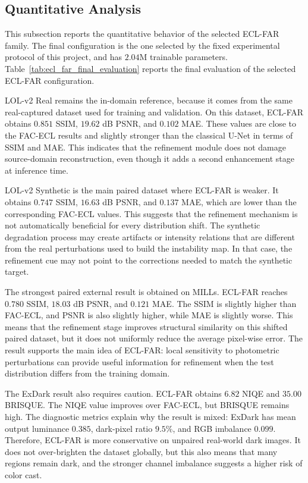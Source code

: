 \subsection{Quantitative Analysis}

This subsection reports the quantitative behavior of the selected ECL-FAR family. The final configuration is the one selected by the fixed experimental protocol of this project, and has $2.04$M trainable parameters. Table~\ref{tab:ecl_far_final_evaluation} reports the final evaluation of the selected ECL-FAR configuration.



LOL-v2 Real remains the in-domain reference, because it comes from the same real-captured dataset used for training and validation. On this dataset, ECL-FAR obtains $0.851$ SSIM, $19.62$ dB PSNR, and $0.102$ MAE. These values are close to the FAC-ECL results and slightly stronger than the classical U-Net in terms of SSIM and MAE. This indicates that the refinement module does not damage source-domain reconstruction, even though it adds a second enhancement stage at inference time.

LOL-v2 Synthetic is the main paired dataset where ECL-FAR is weaker. It obtains $0.747$ SSIM, $16.63$ dB PSNR, and $0.137$ MAE, which are lower than the corresponding FAC-ECL values. This suggests that the refinement mechanism is not automatically beneficial for every distribution shift. The synthetic degradation process may create artifacts or intensity relations that are different from the real perturbations used to build the instability map. In that case, the refinement cue may not point to the corrections needed to match the synthetic target.

The strongest paired external result is obtained on MILLs. ECL-FAR reaches $0.780$ SSIM, $18.03$ dB PSNR, and $0.121$ MAE. The SSIM is slightly higher than FAC-ECL, and PSNR is also slightly higher, while MAE is slightly worse. This means that the refinement stage improves structural similarity on this shifted paired dataset, but it does not uniformly reduce the average pixel-wise error. The result supports the main idea of ECL-FAR: local sensitivity to photometric perturbations can provide useful information for refinement when the test distribution differs from the training domain.

The ExDark result also requires caution. ECL-FAR obtains $6.82$ NIQE and $35.00$ BRISQUE. The NIQE value improves over FAC-ECL, but BRISQUE remains high. The diagnostic metrics explain why the result is mixed: ExDark has mean output luminance $0.385$, dark-pixel ratio $9.5\%$, and RGB imbalance $0.099$. Therefore, ECL-FAR is more conservative on unpaired real-world dark images. It does not over-brighten the dataset globally, but this also means that many regions remain dark, and the stronger channel imbalance suggests a higher risk of color cast.

